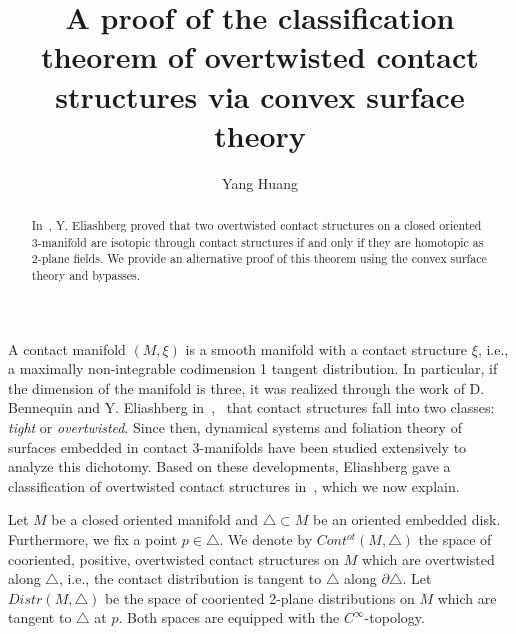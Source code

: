 \documentclass[12pt]{amsart}
\theoremstyle{remark}
\newcommand{\bdry}{\partial}
\begin{document}

\title[A proof of the classification theorem of overtwisted contact structures]{A proof of the classification theorem of overtwisted contact structures via convex surface theory}

\author{Yang Huang}
\address{University of Southern California, Los Angeles, CA 90089}

\begin{abstract}
In~\cite{El}, Y. Eliashberg proved that two overtwisted contact structures on a closed oriented 3-manifold are isotopic through contact structures if and only if they are homotopic as 2-plane fields. We provide an alternative proof of this theorem using the convex surface theory and bypasses.
\end{abstract}

\maketitle



\tableofcontents


A contact manifold $(M,\xi)$ is a smooth manifold with a contact structure $\xi$, i.e., a maximally non-integrable codimension 1 tangent distribution. In particular, if the dimension of the manifold is three, it was realized through the work of D. Bennequin and Y. Eliashberg in~\cite{Be},~\cite{El1} that contact structures fall into two classes: {\em tight} or {\em overtwisted}. Since then, dynamical systems and foliation theory of surfaces embedded in contact 3-manifolds have been studied extensively to analyze this dichotomy. Based on these developments, Eliashberg gave a classification of overtwisted contact structures in~\cite{El}, which we now explain.

Let $M$ be a closed oriented manifold and $\triangle\subset M$ be an oriented embedded disk. Furthermore, we fix a point $p\in\triangle$. We denote by $Cont^{ot}(M,\triangle)$ the space of cooriented, positive, overtwisted contact structures on $M$ which are overtwisted along $\triangle$, i.e., the contact distribution is tangent to $\triangle$ along $\bdry\triangle$. Let $Distr(M,\triangle)$ be the space of cooriented 2-plane distributions on $M$ which are tangent to $\triangle$ at $p$. Both spaces are equipped with the $C^\infty$-topology.
\end{document}
